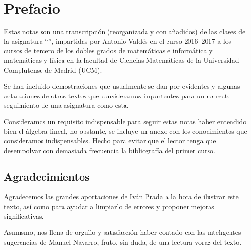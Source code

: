 \section*{Prefacio}
Estas notas son una transcripción (reorganizada y con añadidos) de las clases de la asignatura ``'', impartidas por Antonio Valdés en el curso 2016--2017 a los cursos de tercero de los dobles grados de matemáticas e informática y matemáticas y física en la facultad de Ciencias Matemáticas de la Universidad Complutense de Madrid (UCM).

Se han incluido demostraciones que usualmente se dan por evidentes y algunas aclaraciones de otros textos que consideramos importantes para un correcto seguimiento de una asignatura como esta.

Consideramos un requisito indispensable para seguir estas notas haber entendido bien el álgebra lineal, no obstante, se incluye un anexo con los conocimientos que consideramos indispensables. Hecho para evitar que el lector tenga que desempolvar con demasiada frecuencia la bibliografía del primer curso.
\subsection*{Agradecimientos}
Agradecemos las grandes aportaciones de Iván Prada a la hora de ilustrar este texto, así como para ayudar a limpiarlo de errores y proponer mejoras significativas.

Asimismo, nos llena de orgullo y satisfacción haber contado con las inteligentes sugerencias de Manuel Navarro, fruto, sin duda, de una lectura voraz del texto. 